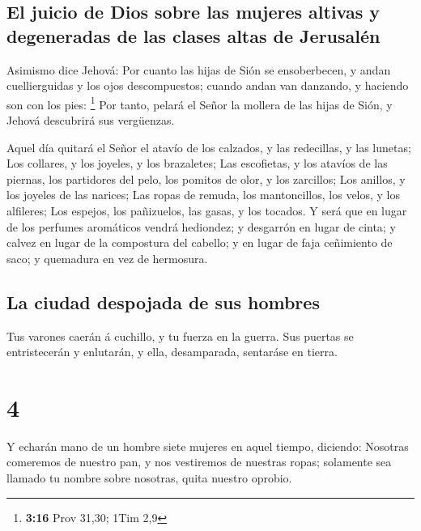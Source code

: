 \hypertarget{el-juicio-de-dios-sobre-las-mujeres-altivas-y-degeneradas-de-las-clases-altas-de-jerusaluxe9n}{%
\subsection{El juicio de Dios sobre las mujeres altivas y degeneradas de
las clases altas de
Jerusalén}\label{el-juicio-de-dios-sobre-las-mujeres-altivas-y-degeneradas-de-las-clases-altas-de-jerusaluxe9n}}

 Asimismo dice Jehová: Por cuanto las hijas de Sión se
ensoberbecen, y andan cuellierguidas y los ojos descompuestos; cuando
andan van danzando, y haciendo son con los pies: \footnote{\textbf{3:16}
  Prov 31,30; 1Tim 2,9}  Por tanto, pelará el Señor la
mollera de las hijas de Sión, y Jehová descubrirá sus vergüenzas.

 Aquel día quitará el Señor el atavío de los calzados, y
las redecillas, y las lunetas;  Los collares, y los
joyeles, y los brazaletes;  Las escofietas, y los atavíos
de las piernas, los partidores del pelo, los pomitos de olor, y los
zarcillos;  Los anillos, y los joyeles de las narices;
 Las ropas de remuda, los mantoncillos, los velos, y los
alfileres;  Los espejos, los pañizuelos, las gasas, y los
tocados.  Y será que en lugar de los perfumes aromáticos
vendrá hediondez; y desgarrón en lugar de cinta; y calvez en lugar de la
compostura del cabello; y en lugar de faja ceñimiento de saco; y
quemadura en vez de hermosura.

\hypertarget{la-ciudad-despojada-de-sus-hombres}{%
\subsection{La ciudad despojada de sus
hombres}\label{la-ciudad-despojada-de-sus-hombres}}

 Tus varones caerán á cuchillo, y tu fuerza en la guerra.
 Sus puertas se entristecerán y enlutarán, y ella,
desamparada, sentaráse en tierra.

\hypertarget{section-3}{%
\section{4}\label{section-3}}

 Y echarán mano de un hombre siete mujeres en aquel tiempo,
diciendo: Nosotras comeremos de nuestro pan, y nos vestiremos de
nuestras ropas; solamente sea llamado tu nombre sobre nosotras, quita
nuestro oprobio.

